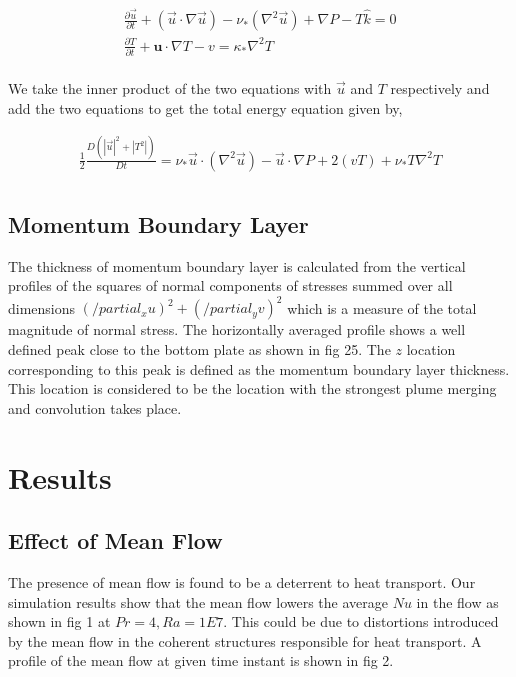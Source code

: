 \documentclass[12pt]{article}
\newcommand{\lapl}{\nabla^{2}}
\newcommand{\lr}[1]{\left(#1\right)}
\begin{document}
    
    \begin{align}
    \frac{\partial \vec{u}}{\partial t} + \lr{\vec{u} \cdot \nabla \vec{u}} - \nu_*\lr{\lapl \vec{u}} + \nabla P - T\hat k = 0 \\
    \frac{\partial T}{\partial t} + \mathbf{u}\cdot\nabla T - v = \kappa_{*}\lapl T \\
    \end{align}
    
    We take the inner product of the two equations with $\vec{u}$ and $T$ respectively and add the two equations to get the total energy equation given by,
    
    \begin{align}
    \frac{1}{2}\frac{D\lr{|\vec{u}|^2 + |{T}^2|}}{D t} = \nu_*\vec u \cdot \lr{\lapl \vec{u}} - \vec u \cdot \nabla P  +  2(vT) + \nu_* T \lapl T\\
    \end{align}
    
    \subsection{Momentum Boundary Layer}
    
    The thickness of momentum boundary layer is calculated from the vertical profiles of the squares of normal components of stresses summed over all dimensions $(/partial_x u)^2 + (/partial_y v)^2$ which is a measure of the total magnitude of normal stress. The horizontally averaged profile shows a well defined peak close to the bottom plate as shown in fig 25. The $z$ location corresponding to this peak is defined as the momentum boundary layer thickness. This location is considered to be the location with the strongest plume merging and convolution takes place.
    
    
     \section{Results}
     \subsection{Effect of Mean Flow}
     The presence of mean flow is found to be a deterrent to heat transport. Our simulation results show that the mean flow lowers the average $Nu$ in the flow as shown in fig 1 at $Pr = 4, Ra = 1E7$. This could be due to distortions introduced by the mean flow in the coherent structures responsible for heat transport. A profile of the mean flow at given time instant is shown in fig 2.
     
\end{document}

